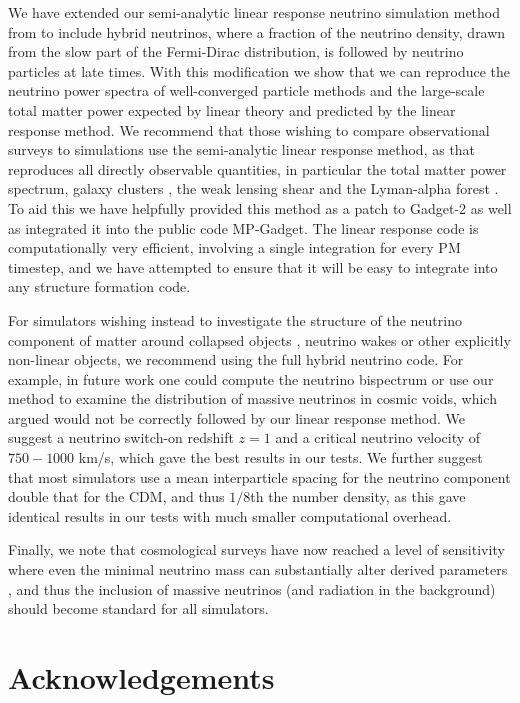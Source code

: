 \documentclass[useAMS, usenatbib]{mnras}
\begin{document}
We have extended our semi-analytic linear response neutrino simulation method from \cite{AHB} to include hybrid neutrinos, where a fraction of the neutrino density, drawn from the slow part of the Fermi-Dirac distribution, is followed by neutrino particles at late times. With this modification we show that we can reproduce the neutrino power spectra of well-converged particle methods and the large-scale total matter power expected by linear theory and predicted by the linear response method. We recommend that those wishing to compare observational surveys to simulations use the semi-analytic linear response method, as that reproduces all directly observable quantities, in particular the total matter power spectrum, galaxy clusters \citep{McCarthy_2017}, the weak lensing shear \citep{Liu_2017} and the Lyman-alpha forest \citep{AHB}. To aid this we have helpfully provided this method as a patch to Gadget-2 as well as integrated it into the public code MP-Gadget. The linear response code is computationally very efficient, involving a single integration for every PM timestep, and we have attempted to ensure that it will be easy to integrate into any structure formation code.

For simulators wishing instead to investigate the structure of the neutrino component of matter around collapsed objects \citep{FVN_2013}, neutrino wakes \cite{Inman_2015} or other explicitly non-linear objects, we recommend using the full hybrid neutrino code. For example, in future work one could compute the neutrino bispectrum \citep{Furhrer_2015} or use our method to examine the distribution of massive neutrinos in cosmic voids, which \cite{Banerjee_2016} argued would not be correctly followed by our linear response method. We suggest a neutrino switch-on redshift $z=1$ and a critical neutrino velocity of $750-1000$ km/s, which gave the best results in our tests. We further suggest that most simulators use a mean interparticle spacing for the neutrino component double that for the CDM, and thus $1/8$th the number density, as this gave identical results in our tests with much smaller computational overhead.

Finally, we note that cosmological surveys have now reached a level of sensitivity where even the minimal neutrino mass can substantially alter derived parameters \cite{Calabrese_2017}, and thus the inclusion of massive neutrinos (and radiation in the background) should become standard for all simulators.

\section*{Acknowledgements}
\end{document}
